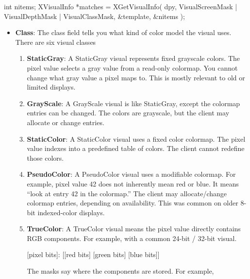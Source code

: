 \documentclass{report}
\begin{document}
\begin{itemize}
\begin{cppcode}
                int nitems;
                XVisualInfo *matches = XGetVisualInfo(
                    dpy,
                    VisualScreenMask | VisualDepthMask | VisualClassMask,
                    &template,
                    &nitems
                );
            \end{cppcode}
            \begin{itemize}
                \item \textbf{Class}: The class field tells you what kind of color model the visual uses. There are six visual classes
                    \begin{enumerate}
                        \item \textbf{StaticGray}: A StaticGray visual represents fixed grayscale colors. The pixel value selects a gray value from a read-only colormap.
                            \bigbreak \noindent 
                            You cannot change what gray value a pixel maps to. This is mostly relevant to old or limited displays.
                        \item \textbf{GrayScale}: A GrayScale visual is like StaticGray, except the colormap entries can be changed. The colors are grayscale, but the client may allocate or change entries.
                        \item \textbf{StaticColor}: A StaticColor visual uses a fixed color colormap. The pixel value indexes into a predefined table of colors. The client cannot redefine those colors.
                        \item \textbf{PseudoColor}: A PseudoColor visual uses a modifiable colormap. For example, pixel value 42 does not inherently mean red or blue. It means “look at entry 42 in the colormap.”
                            \bigbreak \noindent 
                            The client may allocate/change colormap entries, depending on availability. This was common on older 8-bit indexed-color displays.
                        \item \textbf{TrueColor}: A TrueColor visual means the pixel value directly contains RGB components. For example, with a common 24-bit / 32-bit visual.
                            \begin{center}
                                [pixel bits]: [[red bits] [green bits] [blue bits]]
                            \end{center}
                            The masks say where the components are stored. For example,
                            \bigbreak \noindent 
                            \begin{cppcode}

\end{cppcode}
\end{enumerate}
\end{itemize}
\end{itemize}
\end{document}

